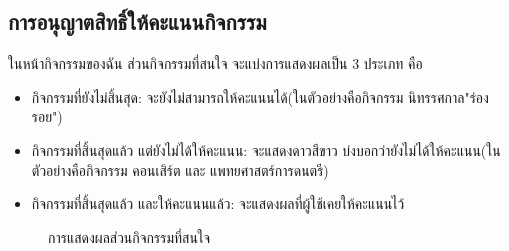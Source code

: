 \subsection{การอนุญาตสิทธิ์ให้คะแนนกิจกรรม}
ในหน้ากิจกรรมของฉัน ส่วนกิจกรรมที่สนใจ จะแบ่งการแสดงผลเป็น 3 ประเภท คือ 
\begin{itemize}
    \item กิจกรรมที่ยังไม่สิ้นสุด: จะยังไม่สามารถให้คะแนนได้(ในตัวอย่างคือกิจกรรม นิทรรศกาล"ร่องรอย")
    \item กิจกรรมที่สิ้นสุดแล้ว แต่ยังไม่ได้ให้คะแนน: จะแสดงดาวสีขาว บ่งบอกว่ายังไม่ได้ให้คะแนน(ในตัวอย่างคือกิจกรรม คอนเสิร์ต และ แพทยศาสตร์การดนตรี)
    \item กิจกรรมที่สิ้นสุดแล้ว และให้คะแนนแล้ว: จะแสดงผลที่ผู้ใช้เคยให้คะแนนไว้
\end{itemize}
\begin{figure}[H]
    \begin{center}
    \end{center}
    \caption[ผลทดลองการแสดงผลส่วนกิจกรรมที่สนใจ]{การแสดงผลส่วนกิจกรรมที่สนใจ}
    \label{fig:score-section-2}
\end{figure}
\clearpage
